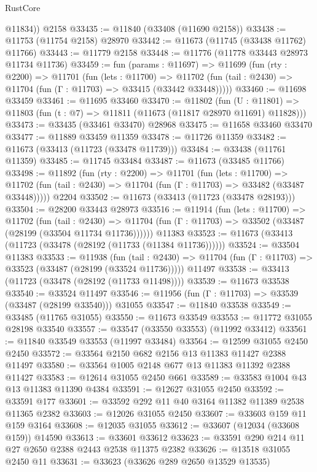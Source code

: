 \begin{lexlean}{RustCore}
\begin{coremodule}
        @11834))
    @2158
@33435 := @11840 (@33408 (@11690 @2158))
@33438 := @11753 (@11754 @2158) @28970
@33442 := @11673 (@11745 (@33438 @11762) @11766)
@33443 := @11779 @2158
@33448 := @11776 (@11778 @33443 @28973 @11734 @11736)
@33459 := fun (params : @11697) =>
  @11699
    (fun (rty : @2200) =>
    @11701
      (fun (lets : @11700) =>
      @11702 (fun (tail : @2430) => @11704 (fun (Γ : @11703) => @33415 (@33442 @33448)))))
@33460 := @11698 @33459
@33461 := @11695 @33460
@33470 := @11802
    (fun (U : @11801) => @11803 (fun (t : @7) => @11811 (@11673 (@11817 @28970 @11691) @11828)))
@33473 := @33435 (@33461 @33470) @28968
@33475 := @11658 @33460 @33470
@33477 := @11889 @33459 @11359
@33478 := @11726 @11359
@33482 := @11673 (@33413 (@11723 (@33478 @11739)))
@33484 := @33438 (@11761 @11359)
@33485 := @11745 @33484
@33487 := @11673 (@33485 @11766)
@33498 := @11892
    (fun (rty : @2200) =>
    @11701
      (fun (lets : @11700) =>
      @11702 (fun (tail : @2430) => @11704 (fun (Γ : @11703) => @33482 (@33487 @33448)))))
    @2204
@33502 := @11673 (@33413 (@11723 (@33478 @28193)))
@33504 := @28200 @33443 @28973
@33516 := @11914
    (fun (lets : @11700) =>
    @11702
      (fun (tail : @2430) =>
      @11704 (fun (Γ : @11703) => @33502 (@33487 (@28199 (@33504 @11734 @11736))))))
    @11383
@33523 := @11673 (@33413 (@11723 (@33478 (@28192 (@11733 (@11384 @11736))))))
@33524 := @33504 @11383
@33533 := @11938
    (fun (tail : @2430) => @11704 (fun (Γ : @11703) => @33523 (@33487 (@28199 (@33524 @11736)))))
    @11497
@33538 := @33413 (@11723 (@33478 (@28192 (@11733 @11498))))
@33539 := @11673 @33538
@33540 := @33524 @11497
@33546 := @11956 (fun (Γ : @11703) => @33539 (@33487 (@28199 @33540))) @31055
@33547 := @11840 @33538
@33549 := @33485 (@11765 @31055)
@33550 := @11673 @33549
@33553 := @11772 @31055 @28198 @33540
@33557 := @33547 (@33550 @33553) (@11992 @33412)
@33561 := @11840 @33549 @33553 (@11997 @33484)
@33564 := @12599 @31055 @2450 @2450
@33572 := @33564 @2150 @682 @2156 @13 @11383 @11427 @2388 @11497
@33580 := @33564 @1005 @2148 @677 @13 @11383 @11392 @2388 @11427
@33583 := @12614 @31055 @2450 @661
@33589 := @33583 @1004 @43 @13 @11383 @11390 @4384
@33591 := @12627 @31055 @2450
@33592 := @33591 @177
@33601 := @33592 @292 @11 @40 @3164 @11382 @11389 @2538 @11365 @2382
@33603 := @12026 @31055 @2450
@33607 := @33603 @159 @11 @159 @3164
@33608 := @12035 @31055
@33612 := @33607 (@12034 (@33608 @159)) @14590
@33613 := @33601 @33612
@33623 := @33591 @290 @214 @11 @27 @2650 @2388 @2443 @2538 @11375 @2382
@33626 := @13518 @31055 @2450 @11
@33631 := @33623 (@33626 @289 @2650 @13529 @13535)

\end{coremodule}
\end{lexlean}
